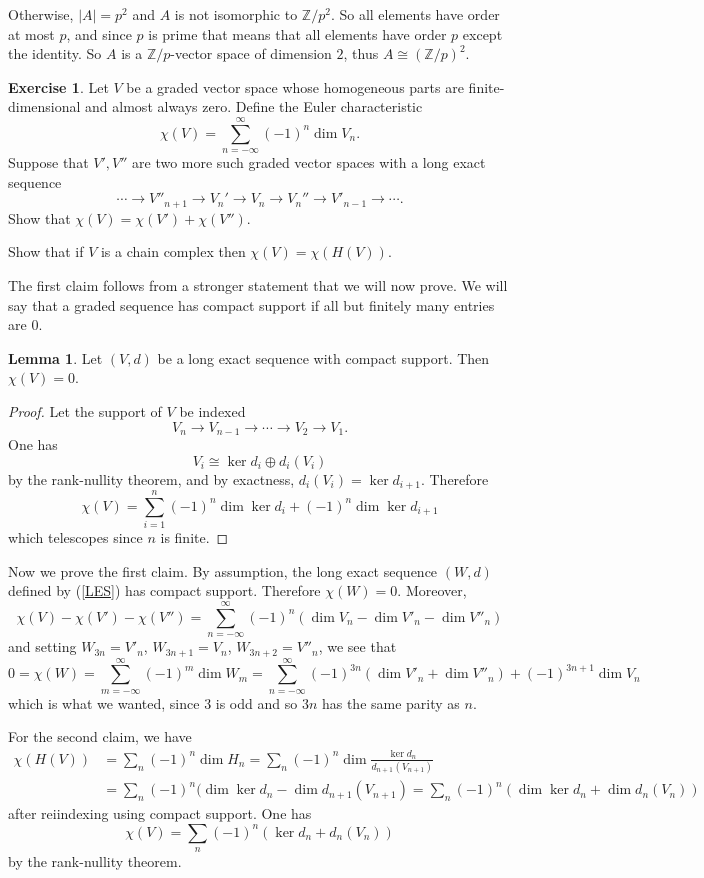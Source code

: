 \documentclass[10pt]{article}
\newcommand{\ZZ}{\mathbb{Z}}
\theoremstyle{definition}
\newtheorem{exer}{Exercise}
\newtheorem{lemma}{Lemma}[exer]
\begin{document}
Otherwise, $|A| = p^2$ and $A$ is not isomorphic to $\ZZ/p^2$.
So all elements have order at most $p$, and since $p$ is prime that means that all elements have order $p$ except the identity.
So $A$ is a $\ZZ/p$-vector space of dimension $2$, thus $A \cong (\ZZ/p)^2$.

\begin{exer}
Let $V$ be a graded vector space whose homogeneous parts are finite-dimensional and almost always zero. Define the Euler characteristic
$$\chi(V) = \sum_{n=-\infty}^\infty (-1)^n \dim V_n.$$
Suppose that $V', V''$ are two more such graded vector spaces with a long exact sequence
\begin{equation}
\label{LES}
\cdots \to V''_{n+1} \to V_n' \to V_n \to V_n'' \to V'_{n-1} \to \cdots.
\end{equation}
Show that $\chi(V) = \chi(V') + \chi(V'')$.

Show that if $V$ is a chain complex then $\chi(V) = \chi(H(V))$.
\end{exer}

The first claim follows from a stronger statement that we will now prove.
We will say that a graded sequence has compact support if all but finitely many entries are $0$.
\begin{lemma}
Let $(V, d)$ be a long exact sequence with compact support. Then $\chi(V) = 0$.
\end{lemma}
\begin{proof}
Let the support of $V$ be indexed
$$V_n \to V_{n-1} \to \cdots \to V_2 \to V_1.$$
One has
$$V_i \cong \ker d_i \oplus d_i(V_i)$$
by the rank-nullity theorem, and by exactness, $d_i(V_i) = \ker d_{i+1}$. Therefore
$$\chi(V) = \sum_{i=1}^n (-1)^n\dim \ker d_i + (-1)^n\dim \ker d_{i+1}$$
which telescopes since $n$ is finite.
\end{proof}
Now we prove the first claim. By assumption, the long exact sequence $(W, d)$ defined by (\ref{LES}) has compact support.
Therefore $\chi(W) = 0$.
Moreover,
$$\chi(V) - \chi(V') - \chi(V'') = \sum_{n=-\infty}^\infty (-1)^n(\dim V_n - \dim V'_n - \dim V''_n)$$
and setting $W_{3n} = V'_n$, $W_{3n+1} = V_n$, $W_{3n+2} = V''_n$, we see that
$$0 = \chi(W) = \sum_{m=-\infty}^\infty (-1)^m \dim W_m = \sum_{n=-\infty}^\infty (-1)^{3n}(\dim V'_n + \dim V''_n) + (-1)^{3n+1} \dim V_n $$
which is what we wanted, since $3$ is odd and so $3n$ has the same parity as $n$.

For the second claim, we have
\begin{align*}
\chi(H(V)) &= \sum_n (-1)^n \dim H_n = \sum_n (-1)^n \dim \frac{\ker d_n}{d_{n+1}(V_{n+1})}\\
&= \sum_n (-1)^n (\dim \ker d_n - \dim d_{n+1}(V_{n+1}) = \sum_n (-1)^n (\dim \ker d_n + \dim d_n(V_n))
\end{align*}
after reiindexing using compact support.
One has
$$\chi(V) = \sum_n (-1)^n (\ker d_n + d_n(V_n))$$
by the rank-nullity theorem.
\end{document}
